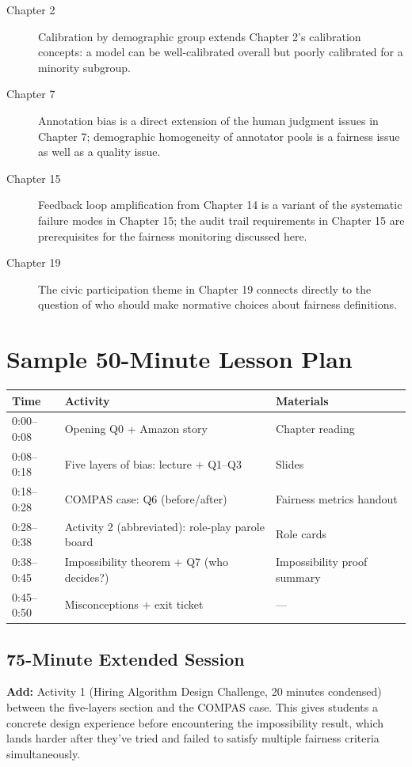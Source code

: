 \begin{description}
    \item[Chapter 2] Calibration by demographic group extends Chapter 2's calibration concepts: a model can be well-calibrated overall but poorly calibrated for a minority subgroup.
    \item[Chapter 7] Annotation bias is a direct extension of the human judgment issues in Chapter 7; demographic homogeneity of annotator pools is a fairness issue as well as a quality issue.
    \item[Chapter 15] Feedback loop amplification from Chapter 14 is a variant of the systematic failure modes in Chapter 15; the audit trail requirements in Chapter 15 are prerequisites for the fairness monitoring discussed here.
    \item[Chapter 19] The civic participation theme in Chapter 19 connects directly to the question of who should make normative choices about fairness definitions.
\end{description}

\section*{Sample 50-Minute Lesson Plan}

\begin{center}
\begin{tabular}{p{2cm}p{5cm}p{4cm}}
\toprule
\textbf{Time} & \textbf{Activity} & \textbf{Materials} \\
\midrule
0:00--0:08 & Opening Q0 + Amazon story & Chapter reading \\
0:08--0:18 & Five layers of bias: lecture + Q1--Q3 & Slides \\
0:18--0:28 & COMPAS case: Q6 (before/after) & Fairness metrics handout \\
0:28--0:38 & Activity 2 (abbreviated): role-play parole board & Role cards \\
0:38--0:45 & Impossibility theorem + Q7 (who decides?) & Impossibility proof summary \\
0:45--0:50 & Misconceptions + exit ticket & --- \\
\bottomrule
\end{tabular}
\end{center}

\subsection*{75-Minute Extended Session}

\textbf{Add:} Activity 1 (Hiring Algorithm Design Challenge, 20 minutes condensed) between the five-layers section and the COMPAS case. This gives students a concrete design experience before encountering the impossibility result, which lands harder after they've tried and failed to satisfy multiple fairness criteria simultaneously.
